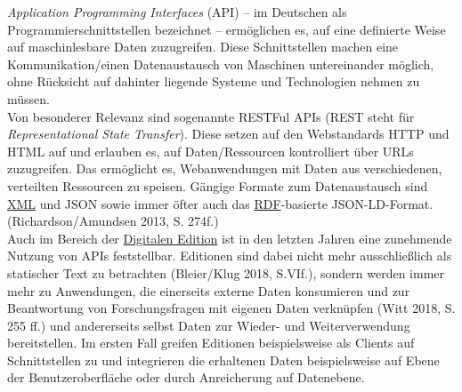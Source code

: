 \documentclass{article}
\begin{document}
    \emph{Application Programming Interfaces} (API) – im Deutschen als Programmierschnittstellen bezeichnet – ermöglichen es, auf eine definierte Weise auf maschinlesbare Daten zuzugreifen. Diese Schnittstellen machen eine Kommunikation/einen Datenaustausch von Maschinen untereinander möglich, ohne Rücksicht auf dahinter liegende Systeme und Technologien nehmen zu müssen. \\
            
        Von besonderer Relevanz sind sogenannte RESTFul APIs (REST steht für \emph{Representational State Transfer}). Diese setzen auf den Webstandards HTTP und HTML auf und erlauben es, auf Daten/Ressourcen kontrolliert über URLs zuzugreifen. Das ermöglicht es, Webanwendungen mit Daten aus verschiedenen, verteilten Ressourcen zu speisen. Gängige Formate zum Datenaustausch sind \href{http://gams.uni-graz.at/o:konde.215}{XML} und JSON sowie immer öfter auch das \href{http://gams.uni-graz.at/o:konde.131}{RDF}-basierte JSON-LD-Format. (Richardson/Amundsen 2013, S. 274f.)\\
            
        Auch im Bereich der \href{http://gams.uni-graz.at/o:konde.59}{Digitalen Edition} ist in den letzten Jahren eine zunehmende Nutzung von APIs feststellbar. Editionen sind dabei nicht mehr ausschließlich als statischer Text zu betrachten (Bleier/Klug 2018, S.VIf.), sondern werden immer mehr zu Anwendungen, die einerseits externe Daten konsumieren und zur Beantwortung von Forschungsfragen mit eigenen Daten verknüpfen (Witt 2018, S. 255 ff.) und andererseits selbst Daten zur Wieder- und Weiterverwendung bereitstellen. Im ersten Fall greifen Editionen beispielsweise als Clients auf Schnittstellen zu und integrieren die erhaltenen Daten beispielsweise auf Ebene der Benutzeroberfläche oder durch Anreicherung auf Datenebene.\\
            
\end{document}
